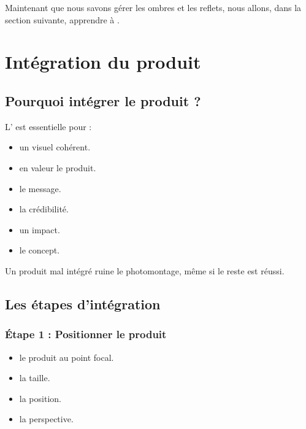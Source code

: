 Maintenant que nous savons gérer les ombres et les reflets, nous allons, dans la section suivante, apprendre à .

\section{Intégration du produit}

\subsection{Pourquoi intégrer le produit ?}

L' est essentielle pour :

\begin{itemize}
    \item {} un visuel cohérent.
    \item {} en valeur le produit.
    \item {} le message.
    \item {} la crédibilité.
    \item {} un impact.
    \item {} le concept.
\end{itemize}

Un produit mal intégré ruine le photomontage, même si le reste est réussi.

\subsection{Les étapes d'intégration}

\subsubsection{Étape 1 : Positionner le produit}

\begin{itemize}
    \item {} le produit au point focal.
    \item {} la taille.
    \item {} la position.
    \item {} la perspective.
\end{itemize}

